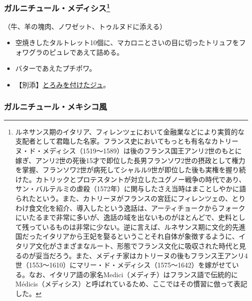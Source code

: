 \begin{recette}
{\subsubsection[ガルニチュール・メディシス]{\texorpdfstring{ガルニチュール・メディシス\footnote{ルネサンス期のイタリア、フィレンツェにおいて金融業などにより実質的な支配者として君臨した名家。フランス史においてもっとも有名なカトリーヌ・ド・メディシス（1519〜1589）は後のフランス国王アンリ2世のもとに嫁ぎ、アンリ2世の死後15才で即位した長男フランソワ2世の摂政として権力を掌握、フランソワ2世が病死してシャルル9世が即位した後も実権を握り続けた。カトリックとプロテスタントが対立したユグノー戦争の時代であり、サン・バルテルミの虐殺（1572年）に関与したさえ当時はまことしやかに語られたという。また、カトリーヌがフランスの宮廷にフィレンツェの、とりわけ食文化を紹介、導入したという逸話は、アーティチョークからフォークにいたるまで非常に多いが、逸話の域を出ないものがほとんどで、史料として残っているものは非常に少ない。逆に言えば、ルネサンス期に文化的先進国だったイタリアから王妃を娶るということそれ自体が象徴するように、イタリア文化がさまざまなルート、形態でフランス文化に吸収された時代と見るのが妥当だろう。また、メディチ家はカトリーヌの後もフランス王アンリ4世（1553〜1610）にマリー・ド・メディシス（1575〜1642）を嫁がせている。なお、イタリア語の家名Medici（メディチ）はフランス語で伝統的にMédicis（メディシス）と呼ばれているため、ここではその慣習に倣って表記した。}}{ガルニチュール・メディシス}}\label{garniture-medicis}}



（牛、羊の塊肉、ノワゼット、トゥルヌドに添える）

\begin{itemize}
\item
  空焼きしたタルトレット10個に、マカロニとさいの目に切ったトリュフをフォワグラのピュレであえて詰める。
\item
  バターであえたプチポワ。
\item
  【別添】\protect\hyperlink{jus-de-veau-lie}{とろみを付けたジュ}。
\end{itemize}

\atoaki{}

\hypertarget{garniture-mexicaine}{%
\subsubsection{ガルニチュール・メキシコ風}\label{garniture-mexicaine}}


\end{recette}
